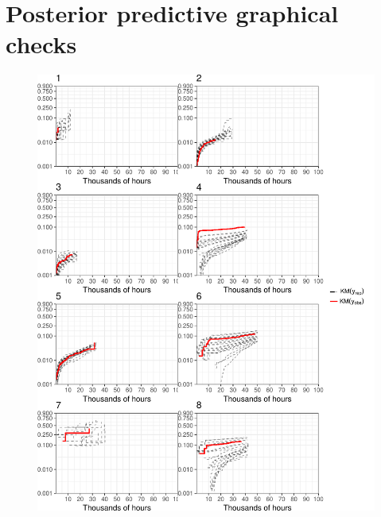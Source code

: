 \documentclass[12pt]{article}
\begin{document}
\section{Posterior predictive graphical checks}
\begin{figure}[H]
\includegraphics[width=\textwidth]{ppcheck-1.pdf}
\end{figure}
\end{document}
